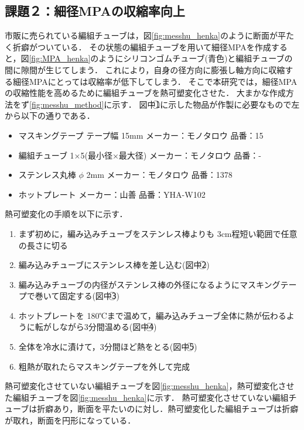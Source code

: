 \subsection{課題２：細径MPAの収縮率向上}
市販に売られている編組チューブは，図\ref{fig:messhu_henka}のように断面が平たく折癖がついている．
その状態の編組チューブを用いて細径MPAを作成すると，図\ref{fig:MPA_henka}のようにシリコンゴムチューブ(青色)と編組チューブの間に隙間が生じてしまう．
これにより，自身の径方向に膨張し軸方向に収縮する細径MPAにとっては収縮率が低下してしまう．
そこで本研究では，細径MPAの収縮性能を高めるために編組チューブを熱可塑変化させた．
大まかな作成方法をず\ref{fig:messhu_method}に示す．
図中\textcircled{\scriptsize 1}に示した物品が作製に必要なもので左から以下の通りである．
%
\begin{itemize}
  \item マスキングテープ テープ幅 15mm メーカー：モノタロウ 品番：15
  \item 編組チューブ 1×5(最小径×最大径) メーカー：モノタロウ 品番：-
  \item ステンレス丸棒 $\phi$ 2mm メーカー：モノタロウ 品番：1378
  \item ホットプレート メーカー：山善 品番：YHA-W102
\end{itemize}
%
熱可塑変化の手順を以下に示す．
\vspace{3mm}
\begin{enumerate}
  \item まず初めに，編み込みチューブをステンレス棒よりも 3cm程短い範囲で任意の長さに切る
  \item 編み込みチューブにステンレス棒を差し込む(図中\textcircled{\scriptsize 2})
  \item 編み込みチューブの内径がステンレス棒の外径になるようにマスキングテープで巻いて固定する(図中\textcircled{\scriptsize 3})
  \item ホットプレートを 180℃まで温めて，編み込みチューブ全体に熱が伝わるように転がしながら3分間温める(図中\textcircled{\scriptsize 4})
  \item 全体を冷水に漬けて，3分間ほど熱をとる(図中\textcircled{\scriptsize 5})
  \item 粗熱が取れたらマスキングテープを外して完成
\end{enumerate}
熱可塑変化させていない編組チューブを図\ref{fig:messhu_henka}，熱可塑変化させた編組チューブを図\ref{fig:messhu_henka}に示す．
熱可塑変化させていない編組チューブは折癖あり，断面を平たいのに対し．熱可塑変化した編組チューブは折癖が取れ，断面を円形になっている．

